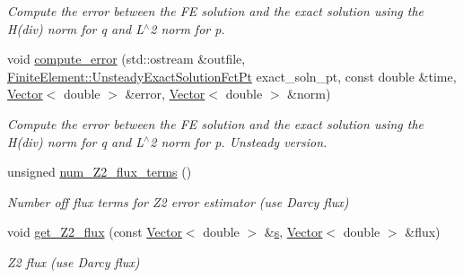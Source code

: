 \begin{DoxyCompactItemize}
\begin{DoxyCompactList}\small\item\em Compute the error between the FE solution and the exact solution using the H(div) norm for q and L$^\wedge$2 norm for p. \end{DoxyCompactList}\item 
void \hyperlink{classoomph_1_1AxisymmetricPoroelasticityEquations_ac9251e1be3256755cdbacca9748f614b}{compute\+\_\+error} (std\+::ostream \&outfile, \hyperlink{classoomph_1_1FiniteElement_ad4ecf2b61b158a4b4d351a60d23c633e}{Finite\+Element\+::\+Unsteady\+Exact\+Solution\+Fct\+Pt} exact\+\_\+soln\+\_\+pt, const double \&time, \hyperlink{classoomph_1_1Vector}{Vector}$<$ double $>$ \&error, \hyperlink{classoomph_1_1Vector}{Vector}$<$ double $>$ \&norm)
\begin{DoxyCompactList}\small\item\em Compute the error between the FE solution and the exact solution using the H(div) norm for q and L$^\wedge$2 norm for p. Unsteady version. \end{DoxyCompactList}\item 
unsigned \hyperlink{classoomph_1_1AxisymmetricPoroelasticityEquations_a209d41a661a1ba1d79d592c8bdef199c}{num\+\_\+\+Z2\+\_\+flux\+\_\+terms} ()
\begin{DoxyCompactList}\small\item\em Number off flux terms for Z2 error estimator (use Darcy flux) \end{DoxyCompactList}\item 
void \hyperlink{classoomph_1_1AxisymmetricPoroelasticityEquations_a0a27551f83320812212a8f72a67740e2}{get\+\_\+\+Z2\+\_\+flux} (const \hyperlink{classoomph_1_1Vector}{Vector}$<$ double $>$ \&\hyperlink{cfortran_8h_ab7123126e4885ef647dd9c6e3807a21c}{s}, \hyperlink{classoomph_1_1Vector}{Vector}$<$ double $>$ \&flux)
\begin{DoxyCompactList}\small\item\em Z2 flux (use Darcy flux) \end{DoxyCompactList}\end{DoxyCompactItemize}

